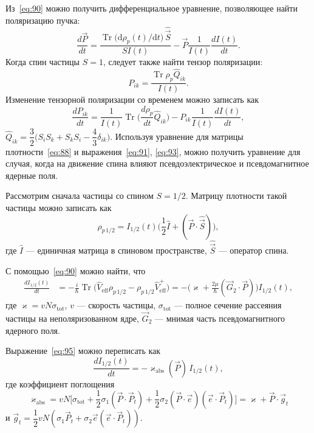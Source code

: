 \documentclass[11pt,a4paper]{article}
\DeclareMathOperator{\Tr}{Tr}
\newcommand{\hvec}[1]{\hat{\vec{#1}}}
\begin{document}
Из~\eqref{eq:90} можно получить дифференциальное уравнение, позволяющее
найти поляризацию пучка:
\begin{equation}
\frac{d\vec{P}}{dt}
=\frac{\Tr\bigl(\mathrm{d}\rho_p(t)/\mathrm{d}t\bigr)\,\hvec{S}}{S I(t)}
-\vec{P}\frac{1}{I(t)}\frac{dI(t)}{dt}.
\label{eq:91}
\end{equation}
Когда спин частицы $S=1$, следует также найти тензор поляризации:
\begin{equation}
P_{ik}=\frac{\Tr\rho_p\hat{Q}_{ik}}{I(t)}.
\label{eq:92}
\end{equation}
Изменение тензорной поляризации со временем можно записать как
\begin{equation}
\frac{dP_{ik}}{dt}
=\frac{1}{I(t)}\Tr\Biggl(\frac{d\rho_p}{dt}\hat{Q}_{ik}\Biggr)
-P_{ik}\frac{1}{I(t)}\frac{dI(t)}{dt},
\label{eq:93}
\end{equation}
$\hat{Q}_{ik}=\dfrac32\bigl(S_i S_k+S_k S_i-\dfrac43\delta_{ik}\bigr)$.
Используя уравнение для матрицы плотности~\eqref{eq:88} и
выражения~\eqref{eq:91}, \eqref{eq:93}, можно получить уравнение для
случая, когда на движение спина влияют псевдоэлектрическое и
псевдомагнитное ядерные поля.

Рассмотрим сначала частицы со спином $S=1/2$. Матрицу плотности такой
частицы можно записать как
\begin{equation}
\rho_{p\,1/2}=I_{1/2}(t)\Biggl(\frac12\hat{I}+(\vec{P}\cdot\hvec{S})\Biggr),
\label{eq:94}
\end{equation}
где $\hat{I}$ --- единичная матрица в спиновом пространстве, $\hvec{S}$ ---
оператор спина.

С помощью~\eqref{eq:90} можно найти, что
\begin{equation}
\begin{aligned}
\frac{d I_{1/2}(t)}{dt}
&=-\frac{i}{\hbar}\Tr\bigl(
\hat{V}_{\mathrm{eff}}\rho_{p\,1/2}-\rho_{p\,1/2}\hat{V}_{\mathrm{eff}}^+
\bigr)
=-\Biggl(\varkappa+\frac{2\mu}{\hbar}(\vec{G}_2\cdot\vec{P})\Biggr)I_{1/2}(t),
\end{aligned}
\label{eq:95}
\end{equation}
где $\varkappa=v N\sigma_{\mathrm{tot}}$, $v$ --- скорость частицы,
$\sigma_{\mathrm{tot}}$ --- полное сечение рассеяния частицы на
неполяризованном ядре, $\vec{G}_2$ --- мнимая часть псевдомагнитного
ядерного поля.

Выражение~\eqref{eq:95} можно переписать как
\begin{equation}
\frac{d I_{1/2}(t)}{dt}=-\varkappa_{\mathrm{abs}}(\vec{P})\,I_{1/2}(t),
\label{eq:96}
\end{equation}
где коэффициент поглощения
\[
\varkappa_{\mathrm{abs}}
=v N\Biggl[
\sigma_{\mathrm{tot}}+\frac12\sigma_1(\vec{P}\cdot\vec{P}_t)
+\frac12\sigma_2(\vec{P}\cdot\vec{e})(\vec{e}\cdot\vec{P}_t)
\Biggr]
=\varkappa+\vec{P}\cdot\vec{g}_t
\]
и $\vec{g}_t=\dfrac12 v N(\sigma_1\vec{P}_t+\sigma_2\vec{e}(\vec{e}\cdot\vec{P}_t))$.
\end{document}
